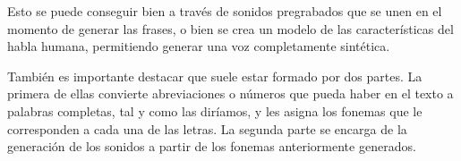Esto se puede conseguir bien a través de sonidos pregrabados que se unen en el momento de generar las frases, o bien se crea un modelo de las características del habla humana, permitiendo generar una voz completamente sintética.

También es importante destacar que suele estar formado por dos partes. La primera de ellas convierte abreviaciones o números que pueda haber en el texto a palabras completas, tal y como las diríamos, y les asigna los fonemas que le corresponden a cada una de las letras. La segunda parte se encarga de la generación de los sonidos a partir de los fonemas anteriormente generados.